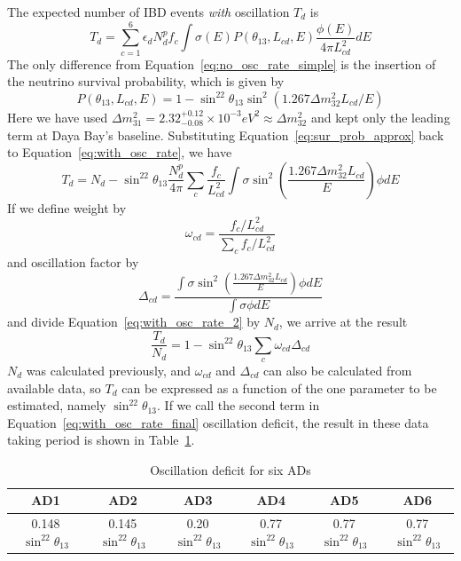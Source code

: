 The expected number of IBD events \emph{with} oscillation $T_d$ is
\begin{equation}\label{eq:with_osc_rate}
	T_d=\sum\limits_{c=1}^6 \epsilon_d N^p_d f_c \int \sigma(E)P(\theta_{13},L_{cd},E)\frac{\phi(E)}{4\pi L_{cd}^2}dE
\end{equation}
The only difference from Equation~\ref{eq:no_osc_rate_simple} is the insertion of the neutrino survival probability, which is given by
\begin{equation}\label{eq:sur_prob_approx}
	P(\theta_{13},L_{cd},E)=1-\sin^22\theta_{13}\sin^2(1.267\Delta m_{32}^2L_{cd}/E)
\end{equation}
Here we have used $\Delta m_{31}^2=2.32^{+0.12}_{-0.08}\times 10^{-3} eV^2\approx \Delta m_{32}^2$ and kept only the leading term at Daya Bay's baseline. Substituting Equation~\ref{eq:sur_prob_approx} back to Equation~\ref{eq:with_osc_rate}, we have
\begin{equation}\label{eq:with_osc_rate_2}
	T_d=N_d-\sin^22\theta_{13}\frac{N^p_d}{4\pi}\sum\limits_{c}\frac{f_c}{L_{cd}^2}\int\sigma\sin^2\left(\frac{1.267\Delta m_{32}^2L_{cd}}{E}\right)\phi dE
\end{equation}
If we define weight by
\begin{equation}\label{eq:omega}
	\omega_{cd}=\frac{f_c/L_{cd}^2}{\sum\limits_{c} f_c/L_{cd}^2}
\end{equation}
and oscillation factor by
\begin{equation}\label{eq:Delta}
	\Delta_{cd}=\frac{\int\sigma\sin^2\left(\frac{1.267\Delta m_{32}^2L_{cd}}{E}\right)\phi dE}{\int\sigma\phi dE}
\end{equation}
and divide Equation~\ref{eq:with_osc_rate_2} by $N_d$, we arrive at the result
\begin{equation}\label{eq:with_osc_rate_final}
	\frac{T_d}{N_d}=1-\sin^22\theta_{13}\sum\limits_{c}\omega_{cd}\Delta_{cd}
\end{equation}
$N_d$ was calculated previously, and $\omega_{cd}$ and $\Delta_{cd}$ can also be calculated from available data, so $T_d$ can be expressed as a function of the one parameter to be estimated, namely $\sin^22\theta_{13}$. If we call the second term in Equation~\ref{eq:with_osc_rate_final} oscillation deficit, the result in these data taking period is shown in Table~\ref{table:ocs_deficit}.
\begin{table}
  \centering
	\begin{tabular}{|c|c|c|c|c|c|}
		\hline
		AD1 & AD2 & AD3 & AD4 & AD5 & AD6 \\
		\hline
		0.148$\sin^22\theta_{13}$ & 0.145$\sin^22\theta_{13}$ & 0.20$\sin^22\theta_{13}$ & 0.77$\sin^22\theta_{13}$ & 0.77$\sin^22\theta_{13}$ & 0.77$\sin^22\theta_{13}$ \\
		\hline
	\end{tabular}
	\caption{Oscillation deficit for six ADs}
	\label{table:ocs_deficit}
\end{table}


